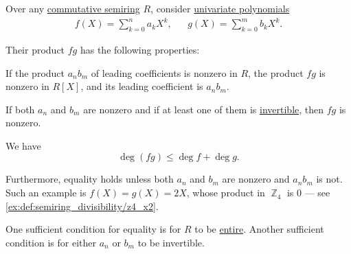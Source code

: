 \begin{proposition}\label{thm:univariate_polynomial_product}
  Over any \hyperref[def:semiring/commutative]{commutative semiring} \( R \), consider \hyperref[def:univariate_polynomial]{univariate polynomials}
  \begin{align*}
    f(X) = \sum_{k=0}^n a_k X^k, &&
    g(X) = \sum_{k=0}^m b_k X^k.
  \end{align*}

  Their product \( fg \) has the following properties:
  \begin{thmenum}
     If the product \( a_n b_m \) of leading coefficients is nonzero in \( R \), the product \( fg \) is nonzero in \( R[X] \), and its leading coefficient is \( a_n b_m \).

     If both \( a_n \) and \( b_m \) are nonzero and if at least one of them is \hyperref[def:semiring_divisibility/invertible]{invertible}, then \( fg \) is nonzero.

     We have
    \begin{equation}\label{eq:thm:univariate_polynomial_product/degree}
      \deg (fg) \leq \deg f + \deg g.
    \end{equation}

    Furthermore, equality holds unless both \( a_n \) and \( b_m \) are nonzero and \( a_n b_m \) is not. Such an example is \( f(X) = g(X) = 2X \), whose product in \hyperref[def:ring_of_integers_modulo]{\( \BbbZ_4 \)} is \( 0 \) --- see \cref{ex:def:semiring_divisibility/z4_x2}.

    One sufficient condition for equality is for \( R \) to be \hyperref[def:entire_semiring]{entire}. Another sufficient condition is for either \( a_n \) or \( b_m \) to be invertible.
  \end{thmenum}
\end{proposition}
